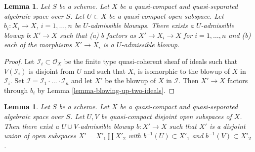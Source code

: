 \documentclass{stacks-project}
\theoremstyle{plain}
\newtheorem{lemma}[subsection]{Lemma}
\theoremstyle{definition}
\theoremstyle{remark}
\numberwithin{equation}{subsection}
\begin{document}
\begin{lemma}
\label{lemma-dominate-admissible-blowups}
Let $S$ be a scheme.
Let $X$ be a quasi-compact and quasi-separated algebraic space over $S$.
Let $U \subset X$ be a quasi-compact open subspace.
Let $b_i : X_i \to X$, $i = 1, \ldots, n$ be $U$-admissible blowups.
There exists a $U$-admissible blowup $b : X' \to X$ such that
(a) $b$ factors as $X' \to X_i \to X$ for $i = 1, \ldots, n$ and
(b) each of the morphisms $X' \to X_i$ is a $U$-admissible blowup.
\end{lemma}

\begin{proof}
Let $\mathcal{I}_i \subset \mathcal{O}_X$ be the finite type
quasi-coherent sheaf of ideals such that $V(\mathcal{I}_i)$ is
disjoint from $U$ and such that $X_i$ is isomorphic to the
blowup of $X$ in $\mathcal{I}_i$. Set
$\mathcal{I} = \mathcal{I}_1 \cdot \ldots \cdot \mathcal{I}_n$
and let $X'$ be the blowup of $X$ in $\mathcal{I}$. Then
$X' \to X$ factors through $b_i$ by Lemma \ref{lemma-blowing-up-two-ideals}.
\end{proof}

\begin{lemma}
\label{lemma-separate-disjoint-opens-by-blowing-up}
Let $S$ be a scheme.
Let $X$ be a quasi-compact and quasi-separated algebraic space over $S$.
Let $U, V$ be quasi-compact disjoint open subspaces of $X$.
Then there exist a $U \cup V$-admissible blowup $b : X' \to X$
such that $X'$ is a disjoint union of open subspaces
$X' = X'_1 \amalg X'_2$ with $b^{-1}(U) \subset X'_1$ and
$b^{-1}(V) \subset X'_2$.
\end{lemma}
\end{document}

